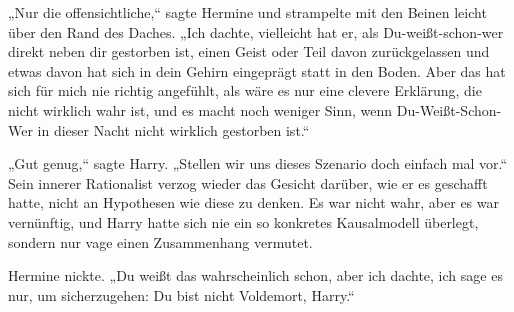 „Nur die offensichtliche,“ sagte Hermine und strampelte mit den Beinen leicht über den Rand des Daches. „Ich dachte, vielleicht hat er, als Du-weißt-schon-wer direkt neben dir gestorben ist, einen Geist oder Teil davon zurückgelassen und etwas davon hat sich in dein Gehirn eingeprägt statt in den Boden. Aber das hat sich für mich nie richtig angefühlt, als wäre es nur eine clevere Erklärung, die nicht wirklich wahr ist, und es macht noch weniger Sinn, wenn Du-Weißt-Schon-Wer in dieser Nacht nicht wirklich gestorben ist.“

„Gut genug,“ sagte Harry. „Stellen wir uns dieses Szenario doch einfach mal vor.“
Sein innerer Rationalist verzog wieder das Gesicht darüber, wie er es geschafft hatte, nicht an Hypothesen wie diese zu denken. Es war nicht wahr, aber es war vernünftig, und Harry hatte sich nie ein so konkretes Kausalmodell überlegt, sondern nur vage einen Zusammenhang vermutet.

Hermine nickte.
„Du weißt das wahrscheinlich schon, aber ich dachte, ich sage es nur, um sicherzugehen: Du bist nicht Voldemort, Harry.“

